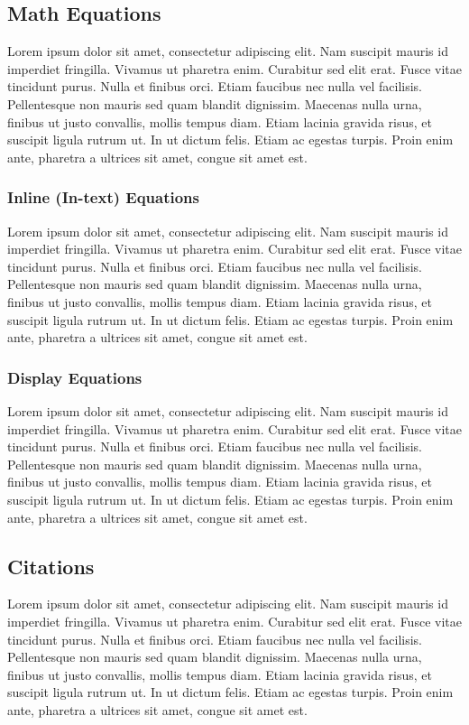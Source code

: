 \subsection{Math Equations}

Lorem ipsum dolor sit amet, consectetur adipiscing elit. Nam suscipit mauris id imperdiet fringilla. Vivamus ut pharetra enim. Curabitur sed elit erat. Fusce vitae tincidunt purus. Nulla et finibus orci. Etiam faucibus nec nulla vel facilisis. Pellentesque non mauris sed quam blandit dignissim. Maecenas nulla urna, finibus ut justo convallis, mollis tempus diam. Etiam lacinia gravida risus, et suscipit ligula rutrum ut. In ut dictum felis. Etiam ac egestas turpis. Proin enim ante, pharetra a ultrices sit amet, congue sit amet est.

\subsubsection{Inline (In-text) Equations}
Lorem ipsum dolor sit amet, consectetur adipiscing elit. Nam suscipit mauris id imperdiet fringilla. Vivamus ut pharetra enim. Curabitur sed elit erat. Fusce vitae tincidunt purus. Nulla et finibus orci. Etiam faucibus nec nulla vel facilisis. Pellentesque non mauris sed quam blandit dignissim. Maecenas nulla urna, finibus ut justo convallis, mollis tempus diam. Etiam lacinia gravida risus, et suscipit ligula rutrum ut. In ut dictum felis. Etiam ac egestas turpis. Proin enim ante, pharetra a ultrices sit amet, congue sit amet est.

\subsubsection{Display Equations}
Lorem ipsum dolor sit amet, consectetur adipiscing elit. Nam suscipit mauris id imperdiet fringilla. Vivamus ut pharetra enim. Curabitur sed elit erat. Fusce vitae tincidunt purus. Nulla et finibus orci. Etiam faucibus nec nulla vel facilisis. Pellentesque non mauris sed quam blandit dignissim. Maecenas nulla urna, finibus ut justo convallis, mollis tempus diam. Etiam lacinia gravida risus, et suscipit ligula rutrum ut. In ut dictum felis. Etiam ac egestas turpis. Proin enim ante, pharetra a ultrices sit amet, congue sit amet est.


\subsection{Citations}
Lorem ipsum dolor sit amet, consectetur adipiscing elit. Nam suscipit mauris id imperdiet fringilla. Vivamus ut pharetra enim. Curabitur sed elit erat. Fusce vitae tincidunt purus. Nulla et finibus orci. Etiam faucibus nec nulla vel facilisis. Pellentesque non mauris sed quam blandit dignissim. Maecenas nulla urna, finibus ut justo convallis, mollis tempus diam. Etiam lacinia gravida risus, et suscipit ligula rutrum ut. In ut dictum felis. Etiam ac egestas turpis. Proin enim ante, pharetra a ultrices sit amet, congue sit amet est.



